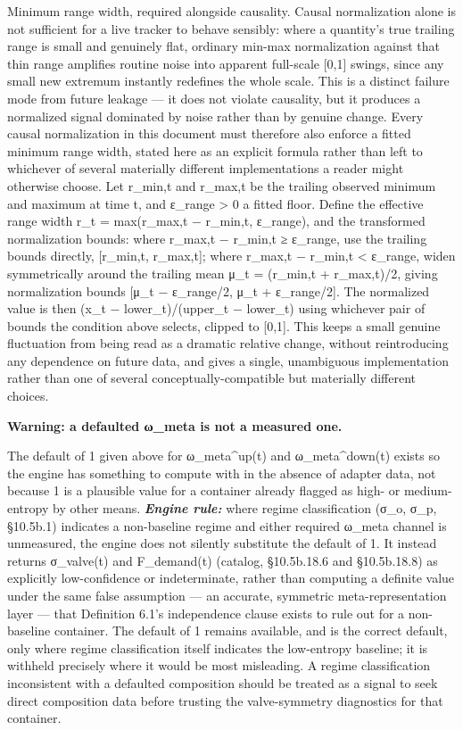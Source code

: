 \documentclass[
]{article}
\begin{document}
Minimum range width, required alongside causality. Causal normalization
alone is not sufficient for a live tracker to behave sensibly: where a
quantity's true trailing range is small and genuinely flat, ordinary
min-max normalization against that thin range amplifies routine noise
into apparent full-scale {[}0,1{]} swings, since any small new extremum
instantly redefines the whole scale. This is a distinct failure mode
from future leakage --- it does not violate causality, but it produces a
normalized signal dominated by noise rather than by genuine change.
Every causal normalization in this document must therefore also enforce
a fitted minimum range width, stated here as an explicit formula rather
than left to whichever of several materially different implementations a
reader might otherwise choose. Let r\_min,t and r\_max,t be the trailing
observed minimum and maximum at time t, and ε\_range \textgreater{} 0 a
fitted floor. Define the effective range width r\_t = max(r\_max,t −
r\_min,t, ε\_range), and the transformed normalization bounds: where
r\_max,t − r\_min,t ≥ ε\_range, use the trailing bounds directly,
{[}r\_min,t, r\_max,t{]}; where r\_max,t − r\_min,t \textless{}
ε\_range, widen symmetrically around the trailing mean μ\_t = (r\_min,t
+ r\_max,t)/2, giving normalization bounds {[}μ\_t − ε\_range/2, μ\_t +
ε\_range/2{]}. The normalized value is then (x\_t − lower\_t)/(upper\_t
− lower\_t) using whichever pair of bounds the condition above selects,
clipped to {[}0,1{]}. This keeps a small genuine fluctuation from being
read as a dramatic relative change, without reintroducing any dependence
on future data, and gives a single, unambiguous implementation rather
than one of several conceptually-compatible but materially different
choices.

\textbf{Warning: a defaulted ω\_meta is not a measured one.}

The default of 1 given above for ω\_meta\^{}up(t) and ω\_meta\^{}down(t)
exists so the engine has something to compute with in the absence of
adapter data, not because 1 is a plausible value for a container already
flagged as high- or medium-entropy by other means. \emph{\textbf{Engine
rule:}} where regime classification (σ\_o, σ\_p, §10.5b.1) indicates a
non-baseline regime and either required ω\_meta channel is unmeasured,
the engine does not silently substitute the default of 1. It instead
returns σ\_valve(t) and F\_demand(t) (catalog, §10.5b.18.6 and
§10.5b.18.8) as explicitly low-confidence or indeterminate, rather than
computing a definite value under the same false assumption --- an
accurate, symmetric meta-representation layer --- that Definition 6.1's
independence clause exists to rule out for a non-baseline container. The
default of 1 remains available, and is the correct default, only where
regime classification itself indicates the low-entropy baseline; it is
withheld precisely where it would be most misleading. A regime
classification inconsistent with a defaulted composition should be
treated as a signal to seek direct composition data before trusting the
valve-symmetry diagnostics for that container.
\end{document}
